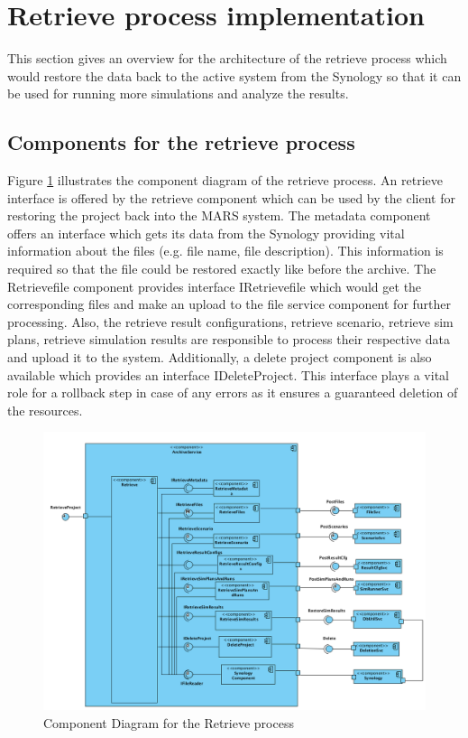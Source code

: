 \section{Retrieve process implementation}
This section gives an overview for the architecture of the retrieve process which would restore the data back to the active
system from the Synology so that it can be used for running more simulations and analyze the results.

\subsection{Components for the retrieve process}
 Figure \ref{fig:restore} illustrates the component diagram of the retrieve process. An retrieve interface is offered by the retrieve component which can be used by
 the client for restoring the project back into the MARS system. The metadata component offers an interface which gets its data from the Synology 
 providing vital information about the files (e.g. file name, file description). This information is required so that the file could be restored exactly like before the
 archive. The Retrievefile component provides interface IRetrievefile which would get the corresponding files and make an upload to the file service component for further
processing. Also, the retrieve result configurations, retrieve scenario, retrieve sim plans, retrieve simulation results are responsible to process their respective data and upload 
it to the system. Additionally, a delete project component is also available which provides an interface IDeleteProject. This interface plays a vital role for a rollback step
in case of any errors as it ensures a guaranteed deletion of the resources.

\begin{figure}[H]
    \centering \includegraphics[scale=0.46]{grafiken/restoreComponent.png}
    \caption{Component Diagram for the Retrieve process}
    \label{fig:restore}
\end{figure}

